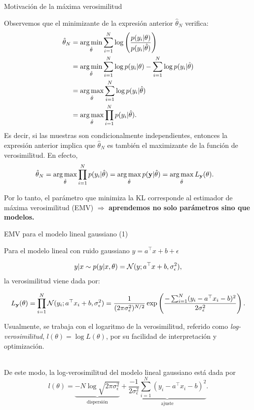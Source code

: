 \documentclass[handout, 9pt]{beamer}
\begin{document}
\begin{frame}{Motivación de la máxima verosimilitud}

Observemos que el minimizante de la expresión anterior $\hat\theta_N$ verifica:
 \begin{align*}
 	\hat\theta_N & =  \operatorname*{arg\,min}_{\hat\theta}  \sum_{i=1}^N\log\left(\frac{p(y_i|\theta)}{p(y_i|\hat\theta)}\right)\\
 				&= \operatorname*{arg\,min}_{\hat\theta}  \sum_{i=1}^N  \log p(y_i|\theta) - \sum_{i=1}^N \log p(y_i|\hat\theta)\nonumber\\
 				&= \operatorname*{arg\,max}_{\hat\theta}  \sum_{i=1}^N \log p(y_i|\hat\theta)\nonumber\\
 				&= \operatorname*{arg\,max}_{\hat\theta}  \prod_{i=1}^N p(y_i|\hat\theta).\nonumber
 \end{align*}\pause
Es decir, si las muestras son condicionalmente independientes, entonces la expresión anterior implica que $\hat\theta_N$ es también el maximizante de la función de verosimilitud. En efecto,
 \begin{align*}
 	\hat\theta_N &= \operatorname*{arg\,max}_{\hat\theta}  \prod_{i=1}^N p(y_i|\hat\theta) = \operatorname*{arg\,max}_{\hat\theta}  p(\mathbf{y}|\hat\theta) = \operatorname*{arg\,max}_{\hat\theta}  L_{\mathbf{y}}(\theta). 
 \end{align*}
 
 Por lo tanto, el parámetro que minimiza la KL corresponde al estimador de máxima verosimilitud (EMV) $\Rightarrow$ \textbf{aprendemos no solo parámetros sino que modelos.}
	
\end{frame}

\begin{frame}{EMV para el modelo lineal gaussiano (1)}

Para el modelo lineal con ruido gaussiano $y=a^\top x + b + \epsilon$

\begin{equation*}
	y|x \sim p(y|x,\theta) = {\mathcal N}(y;a^\top x + b ,\sigma_\epsilon^2),\label{eq:mod_lin_gau}
\end{equation*}
la verosimilitud viene dada por:

\begin{equation*}
	L_{\mathbf{y}}(\theta) =  \prod_{i=1}^N {\mathcal N}(y_i;a^\top x_i + b,\sigma_\epsilon^2) = \frac{1}{(2\pi\sigma_\epsilon^2)^{N/2}}  \exp\left(\frac{-\sum_{i=1}^N(y_i-a^\top x_i - b)^2}{2\sigma_\epsilon^2}\right). \label{eq:verosimilitud_lineal}
\end{equation*}\pause

Usualmente, se trabaja con el logaritmo de la verosimilitud, referido como \emph{log-verosimilitud}, $l(\theta) = \log L(\theta)$, por su facilidad de interpretación y optimización.\\~\

 De este modo, la log-verosimilitud del modelo lineal gaussiano está dada por
\begin{equation*}
	l(\theta) 
		= \underbrace{-N\log \sqrt{2\pi\sigma^2_\epsilon}}_{\text{dispersión}} + \underbrace{\frac{-1}{2\sigma_\epsilon^2} \sum_{i=1}^N (y_i-a^\top x_i - b)^2}_{\text{ajuste}}.
\end{equation*}
	
\end{frame}
\end{document}
